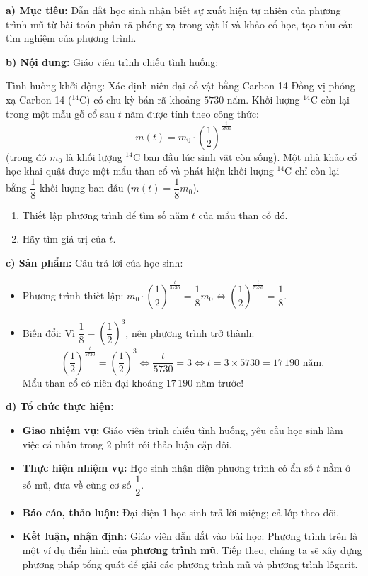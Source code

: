 \documentclass[12pt, a4paper]{article}
\begin{document}
\noindent \textbf{a) Mục tiêu:}
Dẫn dắt học sinh nhận biết sự xuất hiện tự nhiên của phương trình mũ từ bài toán phân rã phóng xạ trong vật lí và khảo cổ học, tạo nhu cầu tìm nghiệm của phương trình.

\noindent \textbf{b) Nội dung:}
Giáo viên trình chiếu tình huống:
\begin{pedabox}{Tình huống khởi động: Xác định niên đại cổ vật bằng Carbon-14}
Đồng vị phóng xạ Carbon-14 ($^{14}\text{C}$) có chu kỳ bán rã khoảng $5730$ năm. Khối lượng $^{14}\text{C}$ còn lại trong một mẫu gỗ cổ sau $t$ năm được tính theo công thức:
$$m(t) = m_0 \cdot \left(\dfrac{1}{2}\right)^{\frac{t}{5730}}$$
(trong đó $m_0$ là khối lượng $^{14}\text{C}$ ban đầu lúc sinh vật còn sống).
Một nhà khảo cổ học khai quật được một mẩu than cổ và phát hiện khối lượng $^{14}\text{C}$ chỉ còn lại bằng $\dfrac{1}{8}$ khối lượng ban đầu ($m(t) = \dfrac{1}{8} m_0$).
\begin{enumerate}[leftmargin=0.6cm]
    \item Thiết lập phương trình để tìm số năm $t$ của mẩu than cổ đó.
    \item Hãy tìm giá trị của $t$.
\end{enumerate}
\end{pedabox}

\noindent \textbf{c) Sản phẩm:}
Câu trả lời của học sinh:
\begin{itemize}
    \item Phương trình thiết lập: $m_0 \cdot \left(\dfrac{1}{2}\right)^{\frac{t}{5730}} = \dfrac{1}{8} m_0 \iff \left(\dfrac{1}{2}\right)^{\frac{t}{5730}} = \dfrac{1}{8}$.
    \item Biến đổi: Vì $\dfrac{1}{8} = \left(\dfrac{1}{2}\right)^3$, nên phương trình trở thành:
    $$\left(\dfrac{1}{2}\right)^{\frac{t}{5730}} = \left(\dfrac{1}{2}\right)^3 \iff \dfrac{t}{5730} = 3 \iff t = 3 \times 5730 = 17\,190\text{ năm}.$$
    Mẩu than cổ có niên đại khoảng $17\,190$ năm trước!
\end{itemize}

\noindent \textbf{d) Tổ chức thực hiện:}
\begin{itemize}[leftmargin=0.6cm]
    \item \textbf{Giao nhiệm vụ:} Giáo viên trình chiếu tình huống, yêu cầu học sinh làm việc cá nhân trong 2 phút rồi thảo luận cặp đôi.
    \item \textbf{Thực hiện nhiệm vụ:} Học sinh nhận diện phương trình có ẩn số $t$ nằm ở số mũ, đưa về cùng cơ số $\dfrac{1}{2}$.
    \item \textbf{Báo cáo, thảo luận:} Đại diện 1 học sinh trả lời miệng; cả lớp theo dõi.
    \item \textbf{Kết luận, nhận định:} Giáo viên dẫn dắt vào bài học: Phương trình trên là một ví dụ điển hình của \textbf{phương trình mũ}. Tiếp theo, chúng ta sẽ xây dựng phương pháp tổng quát để giải các phương trình mũ và phương trình lôgarit.
\end{itemize}
\end{document}
